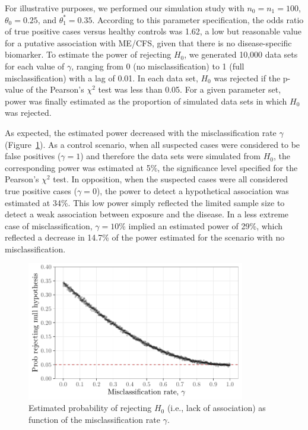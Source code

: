 For illustrative purposes, we performed our simulation study with $n_0 = n_1 = 100$, $\theta_0=0.25$, and $\theta^*_1=0.35$. According to this parameter specification, the odds ratio of true positive cases versus healthy controls was 1.62, a low but reasonable value for a putative association with ME/CFS, given that there is no disease-specific biomarker. To estimate the power of rejecting $H_0$, we generated 10,000 data sets for each value of $\gamma$, ranging from 0 (no misclassification) to 1 (full misclassification) with a lag of 0.01. In each data set, $H_0$ was rejected if the p-value of the Pearson's $\chi^2$ test was less than 0.05. For a given parameter set, power was finally estimated as the proportion of simulated data sets in which $H_0$ was rejected. 

As expected, the estimated power decreased with the misclassification rate  $\gamma$ (Figure~\ref{fig:misclassiification-rates}). As a control scenario, when all suspected cases were considered to be false positives ($\gamma = 1$) and therefore the data sets were simulated from $H_0$, the corresponding power was estimated at 5\%, the significance level specified for the Pearson's $\chi^2$ test. In opposition, when the suspected cases were all considered true positive cases ($\gamma=0$), the power to detect a hypothetical association was estimated at 34\%. This low power simply reflected the limited sample size to detect a weak association between exposure and the disease. In a less extreme case of misclassification, $\gamma=10\%$ implied an estimated power of 29\%, which reflected a decrease in 14.7\% of the power estimated for the scenario with no misclassification.

\begin{figure}[h]
    \centering
    \includegraphics[width=0.85\textwidth]{chapter/2021-statistical-challenges/figures/figure-misclassification-rates.pdf}
    \caption[Estimated probability of rejecting $H_0$ as function of the misclassification rate]{Estimated probability of rejecting $H_0$ (i.e., lack of association) as function of the misclassification rate $\gamma$.}
    \label{fig:misclassiification-rates}
\end{figure}

